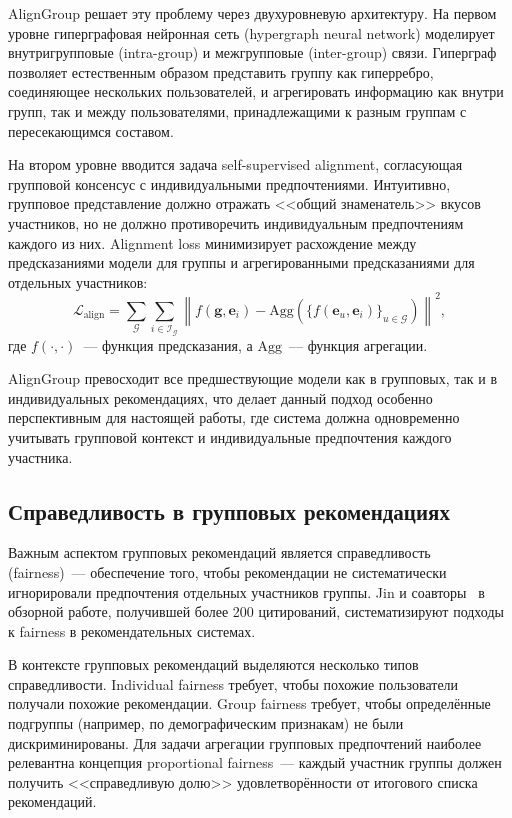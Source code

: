 AlignGroup решает эту проблему через двухуровневую архитектуру. На первом уровне гиперграфовая нейронная сеть (hypergraph neural network) моделирует внутригрупповые (intra-group) и межгрупповые (inter-group) связи. Гиперграф позволяет естественным образом представить группу как гиперребро, соединяющее нескольких пользователей, и агрегировать информацию как внутри групп, так и между пользователями, принадлежащими к разным группам с пересекающимся составом.

На втором уровне вводится задача self-supervised alignment, согласующая групповой консенсус с индивидуальными предпочтениями. Интуитивно, групповое представление должно отражать <<общий знаменатель>> вкусов участников, но не должно противоречить индивидуальным предпочтениям каждого из них. Alignment loss минимизирует расхождение между предсказаниями модели для группы и агрегированными предсказаниями для отдельных участников:
\begin{equation}
    \mathcal{L}_{\mathrm{align}} = \sum_{\mathcal{G}} \sum_{i \in \mathcal{I}_{\mathcal{G}}} \left\| f(\mathbf{g}, \mathbf{e}_i) - \mathrm{Agg}\left(\{f(\mathbf{e}_u, \mathbf{e}_i)\}_{u \in \mathcal{G}}\right) \right\|^2,
\end{equation}
где $f(\cdot, \cdot)$~--- функция предсказания, а $\mathrm{Agg}$~--- функция агрегации.

AlignGroup превосходит все предшествующие модели как в групповых, так и в индивидуальных рекомендациях, что делает данный подход особенно перспективным для настоящей работы, где система должна одновременно учитывать групповой контекст и индивидуальные предпочтения каждого участника.

\subsection{Справедливость в групповых рекомендациях}

Важным аспектом групповых рекомендаций является справедливость (fairness)~--- обеспечение того, чтобы рекомендации не систематически игнорировали предпочтения отдельных участников группы. Jin и соавторы~\cite{jin2023fairness_survey} в обзорной работе, получившей более 200 цитирований, систематизируют подходы к fairness в рекомендательных системах.

В контексте групповых рекомендаций выделяются несколько типов справедливости. Individual fairness требует, чтобы похожие пользователи получали похожие рекомендации. Group fairness требует, чтобы определённые подгруппы (например, по демографическим признакам) не были дискриминированы. Для задачи агрегации групповых предпочтений наиболее релевантна концепция proportional fairness~--- каждый участник группы должен получить <<справедливую долю>> удовлетворённости от итогового списка рекомендаций.

